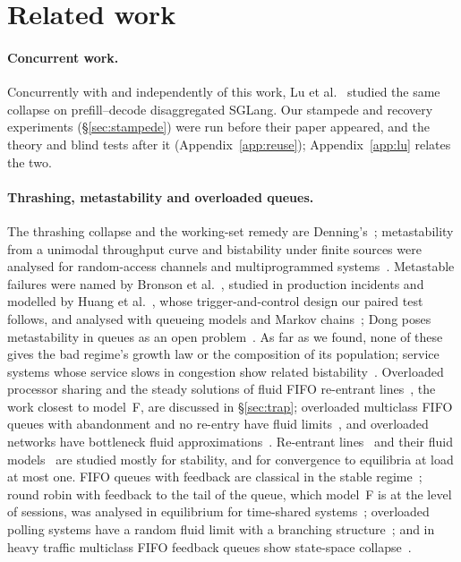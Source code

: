 \section{Related work}\label{sec:related}

\paragraph{Concurrent work.} Concurrently with and independently of this work, Lu et al.~\citep{lu2026cachetrap} studied the same
collapse on prefill--decode disaggregated SGLang. Our stampede and recovery experiments (\S\ref{sec:stampede}) were run before their
paper appeared, and the theory and blind tests after it (Appendix~\ref{app:reuse}); Appendix~\ref{app:lu} relates the two.

\paragraph{Thrashing, metastability and overloaded queues.} The thrashing collapse and the working-set remedy are
Denning's~\citep{denning1968thrashing,denning1968working}; metastability from a unimodal throughput curve and bistability under
finite sources were analysed for random-access channels and multiprogrammed
systems~\citep{kleinrock1975aloha,carleial1975bistable,courtois1975decomposability,nelson1987stochastic}. Metastable failures were
named by Bronson et al.~\citep{bronson2021metastable}, studied in production incidents and modelled by Huang et
al.~\citep{huang2022metastable}, whose trigger-and-control design our paired test follows, and analysed with queueing models and
Markov chains~\citep{isaacs2025analyzing,habibi2024msf,alvaro2025formal}; Dong poses metastability in queues as an open
problem~\citep{dong2022metastability}. As far as we found, none of these gives the bad regime's growth law or the composition of
its population; service systems whose service slows in congestion show related bistability~\citep{chan2014speedup,dong2015slowdowns}.
Overloaded processor sharing and the steady solutions of fluid FIFO re-entrant lines~\citep{khanin2001steady}, the work closest to
model~F, are discussed in \S\ref{sec:trap}; overloaded multiclass FIFO queues with abandonment and no re-entry have fluid
limits~\citep{jennings2013fluid}, and overloaded networks have bottleneck fluid approximations~\citep{chen1991discrete}. Re-entrant
lines~\citep{kumar1993reentrant} and their fluid models~\citep{dai1996stability,bramson1996convergence} are studied mostly for
stability, and for convergence to equilibria at load at most one. FIFO queues with feedback are classical in the stable regime~\citep{takacs1963feedback,vandenberg1989deterministic};
round robin with feedback to the tail of the queue, which model~F is at the level of sessions, was analysed in equilibrium for
time-shared systems~\citep{kleinrock1967timeshared,coffman1968feedback}; overloaded polling systems have a random fluid limit with a
branching structure~\citep{remerova2014random}; and in heavy traffic multiclass FIFO feedback queues show state-space
collapse~\citep{reiman1988multiclass,dai1995multiclass}.

